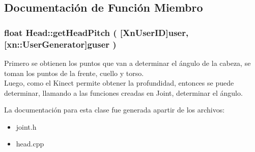 \subsection{\-Documentación de \-Función \-Miembro}
\hypertarget{class_head_ad57a93c84de0a6681dce1dbcdc87823c}{
\subsubsection[{get\-Head\-Pitch}]{\setlength{\rightskip}{0pt plus 5cm}float {\bf \-Head\-::get\-Head\-Pitch} (
[{\-Xn\-User\-I\-D}]{user, }
[{xn\-::\-User\-Generator}]{guser}
)}}\label{class_head_ad57a93c84de0a6681dce1dbcdc87823c}


\-Primero se obtienen los puntos que van a determinar el ángulo de la cabeza, se toman los puntos de la frente, cuello y torso.\\
\-Luego, como el Kinect permite obtener la profundidad, entonces se puede determinar, llamando a las funciones creadas en Joint, determinar el ángulo. 



\-La documentación para esta clase fue generada apartir de los archivos\-:\begin{itemize}
\item 
joint.\-h\item 
head.\-cpp\end{itemize}
